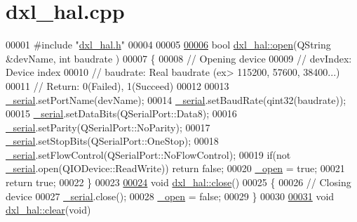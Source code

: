 \hypertarget{a00010_source}{}\section{dxl\+\_\+hal.\+cpp}
\label{a00010_source}

\begin{DoxyCode}
00001 \textcolor{preprocessor}{#include "\hyperlink{a00011}{dxl\_hal.h}"}
00004 
00005 
\hypertarget{a00010_source_l00006}{}\hyperlink{a00002_ab631c2a5533125f14db9a8ec1c33aa7c}{00006} \textcolor{keywordtype}{bool} \hyperlink{a00002_ab631c2a5533125f14db9a8ec1c33aa7c}{dxl\_hal::open}(QString &devName, \textcolor{keywordtype}{int} baudrate )
00007 \{
00008     \textcolor{comment}{// Opening device}
00009     \textcolor{comment}{// devIndex: Device index}
00010     \textcolor{comment}{// baudrate: Real baudrate (ex> 115200, 57600, 38400...)}
00011     \textcolor{comment}{// Return: 0(Failed), 1(Succeed)}
00012     
00013     \hyperlink{a00002_a785d0e35b81d779b54869cad668f9745}{\_serial}.setPortName(devName);
00014     \hyperlink{a00002_a785d0e35b81d779b54869cad668f9745}{\_serial}.setBaudRate(qint32(baudrate));
00015     \hyperlink{a00002_a785d0e35b81d779b54869cad668f9745}{\_serial}.setDataBits(QSerialPort::Data8);
00016     \hyperlink{a00002_a785d0e35b81d779b54869cad668f9745}{\_serial}.setParity(QSerialPort::NoParity);
00017     \hyperlink{a00002_a785d0e35b81d779b54869cad668f9745}{\_serial}.setStopBits(QSerialPort::OneStop);
00018     \hyperlink{a00002_a785d0e35b81d779b54869cad668f9745}{\_serial}.setFlowControl(QSerialPort::NoFlowControl);
00019     \textcolor{keywordflow}{if}(not \hyperlink{a00002_a785d0e35b81d779b54869cad668f9745}{\_serial}.open(QIODevice::ReadWrite)) \textcolor{keywordflow}{return} \textcolor{keyword}{false};
00020     \hyperlink{a00002_a04831154c43fe4f7499ea0950e0f0999}{\_open} = \textcolor{keyword}{true};
00021     \textcolor{keywordflow}{return} \textcolor{keyword}{true};
00022 \}
00023 
\hypertarget{a00010_source_l00024}{}\hyperlink{a00002_a250fd7e4acabf54d0733551a13e89a2d}{00024} \textcolor{keywordtype}{void} \hyperlink{a00002_a250fd7e4acabf54d0733551a13e89a2d}{dxl\_hal::close}()
00025 \{
00026     \textcolor{comment}{// Closing device}
00027     \hyperlink{a00002_a785d0e35b81d779b54869cad668f9745}{\_serial}.close();
00028     \hyperlink{a00002_a04831154c43fe4f7499ea0950e0f0999}{\_open} = \textcolor{keyword}{false};
00029 \}
00030 
\hypertarget{a00010_source_l00031}{}\hyperlink{a00002_a004eedde5af69219d7288ec8ea97c89f}{00031} \textcolor{keywordtype}{void} \hyperlink{a00002_a004eedde5af69219d7288ec8ea97c89f}{dxl\_hal::clear}(\textcolor{keywordtype}{void})

\end{DoxyCode}
